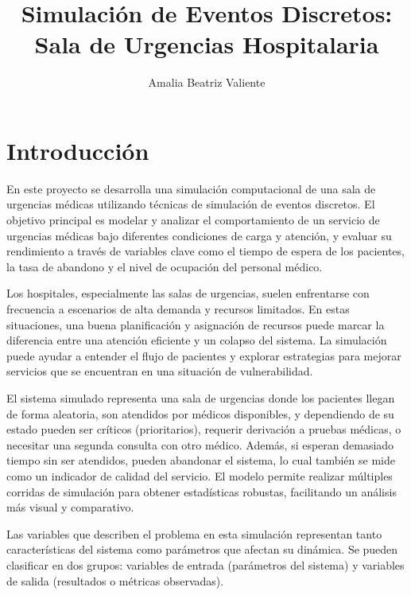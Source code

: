 \documentclass[12pt]{article}
\title{Simulación de Eventos Discretos: Sala de Urgencias Hospitalaria}
\author{Amalia Beatriz Valiente}
\begin{document}
\maketitle

\section{Introducción}
En este proyecto se desarrolla una simulación computacional de una sala de urgencias médicas utilizando técnicas de simulación de eventos discretos. El objetivo principal es modelar y analizar el comportamiento de un servicio de urgencias médicas bajo diferentes condiciones de carga y atención, y evaluar su rendimiento a través de variables clave como el tiempo de espera de los pacientes, la tasa de abandono y el nivel de ocupación del personal médico.

Los hospitales, especialmente las salas de urgencias, suelen enfrentarse con frecuencia a escenarios de alta demanda y recursos limitados. En estas situaciones, una buena planificación y asignación de recursos puede marcar la diferencia entre una atención eficiente y un colapso del sistema. La simulación puede ayudar a entender el flujo de pacientes y explorar estrategias para mejorar servicios que se encuentran en una situación de vulnerabilidad.

El sistema simulado representa una sala de urgencias donde los pacientes llegan de forma aleatoria, son atendidos por médicos disponibles, y dependiendo de su estado pueden ser críticos (prioritarios), requerir derivación a pruebas médicas, o necesitar una segunda consulta con otro médico. Además, si esperan demasiado tiempo sin ser atendidos, pueden abandonar el sistema, lo cual también se mide como un indicador de calidad del servicio. El modelo permite realizar múltiples corridas de simulación para obtener estadísticas robustas, facilitando un análisis más visual y comparativo.

Las variables que describen el problema en esta simulación representan tanto características del sistema como parámetros que afectan su dinámica. Se pueden clasificar en dos grupos: variables de entrada (parámetros del sistema) y variables de salida (resultados o métricas observadas).
\end{document}
